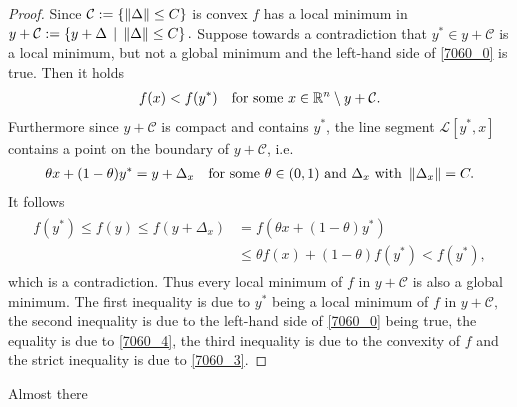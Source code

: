 \begin{proof}
  Since 
  $\mathcal{C}:=\left\{ \left\lVert\Delta\right\rVert\le C \right\}$
  is convex
  $f$ has a local minimum in 
  $
    y + \mathcal{C}
    :=
    \left\{ 
      y + \Delta \,
      \mid \,
      \left\lVert\Delta\right\rVert\le C
    \right\}
    .
  $
  Suppose towards a contradiction that
  $
    y^* \in 
            y + \mathcal{C}
  $
  is a local minimum, but not a global minimum 
  and
  the left-hand side of 
  \eqref{7060_0} is true.
  Then it holds
  \begin{gather}
    \label{7060_3}
    f(x) < f(y^*)
    \quad
    \text{for some}\ 
    x 
    \in 
    \R^n 
    \setminus 
      y + \mathcal{C}
    .
  \end{gather}
  Furthermore since $y + \mathcal{C}$ is compact and contains $y^*$,
  the line segment $\mathcal{L}[y^*,x]$ contains a point on the boundary of 
  $y + \mathcal{C}$, i.e.
  \begin{gather}
    \label{7060_4}
    \theta x + (1 - \theta) y^* = y + \Delta_x
    \quad
    \text{for some}\ 
    \theta \in (0,1)\ 
    \text{and}\ 
    \Delta_x \ 
    \text{with}\ 
    \norm{\Delta_x}=C
    .
  \end{gather}
    It follows
    \begin{align}
      \label{7060_5}
      \begin{split}
      f(y^*)
      \le
      f(y)
      \le
      f(y + \Delta_x)
      &=
      f(
        \theta x + (1 - \theta) y^*
      )
      \\
      &\le
      \theta f(x)
      + 
      (1 - \theta)
      f(y^*)
      <
      f(y^*)
      ,
      \end{split}
    \end{align}
    which is a contradiction.
    Thus every local minimum of $f$ in $y + \mathcal{C}$ is also a global minimum.
    The first inequality is due to
    $y^*$ being a local minimum of $f$ in
    $
      y + \mathcal{C},
    $
    the second inequality is due to the left-hand side of 
    \eqref{7060_0} being true,
    the equality is due to \eqref{7060_4},
    the third inequality is due to the convexity of $f$
    and the strict inequality is due to \eqref{7060_3}.
\end{proof}


\begin{takeaways}
  Almost there 
  \lipsum[1]
\end{takeaways}
